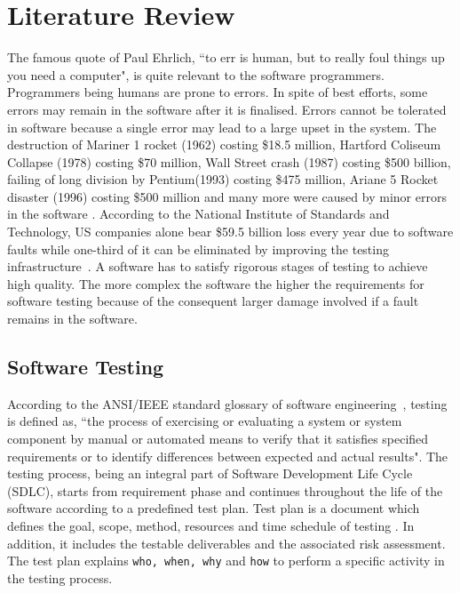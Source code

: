  
\chapter{Literature Review}
\label{chap:softwareTesting}
The famous quote of Paul Ehrlich, ``to err is human, but to really foul things up you need a computer", is quite relevant to the software programmers. Programmers being humans are prone to errors. In spite of best efforts, some errors may remain in the software after it is finalised.  Errors cannot be tolerated in software because a single error may lead to a large upset in the system. The destruction of Mariner 1 rocket (1962) costing \$18.5 million, Hartford Coliseum Collapse (1978) costing \$70 million, Wall Street crash (1987) costing \$500 billion, failing of long division by Pentium\texttrademark (1993) costing \$475 million, Ariane 5 Rocket disaster (1996) costing \$500 million and many more were caused by minor errors in the software \cite{garfinkel2005history}. According to the National Institute of Standards and Technology, US companies alone bear \$59.5 billion loss every year due to software faults while one-third of it can be eliminated by improving the testing infrastructure~\cite{tassey2002economic}. A software has to satisfy rigorous stages of testing to achieve high quality. The more complex the software the higher the requirements for software testing because of the consequent larger damage involved if a fault remains in the software.

\section{Software Testing}
According to the ANSI/IEEE standard glossary of software engineering~\cite{american1984}, testing is defined as, ``the process of exercising or evaluating a system or system component by manual or automated means to verify that it satisfies specified requirements or to identify differences between expected and actual results". The testing process, being an integral part of Software Development Life Cycle (SDLC), starts from requirement phase and continues throughout the life of the software according to a predefined test plan. Test plan is a document which defines the goal, scope, method, resources and time schedule of testing \cite{futrell2001quality}. In addition, it includes the testable deliverables and the associated risk assessment. The test plan explains \verb+who, when, why+ and \verb+how+ to perform a specific activity in the testing process. 

